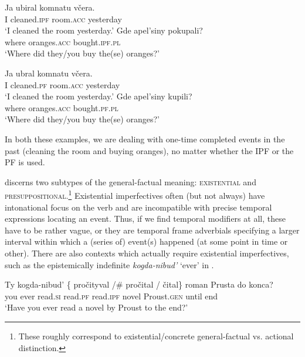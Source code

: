 \documentclass[output=paper,
modfonts,
newtxmath,
hidelinks
]{langscibook}
\begin{document}
\ea\label{oranges}
\ea\gll Ja ubiral komnatu včera.\\
       I cleaned.\textsc{ipf} room.\textsc{acc} yesterday\\
\glt       `I cleaned the room yesterday.'
\ex\gll Gde apel'siny pokupali?\\
               where oranges.\textsc{acc} bought.\textsc{ipf}.\textsc{pl} \\
\glt               `Where did they/you buy the(se) oranges?'
\z\z

\ea\label{orangesPF}
\ea\gll Ja ubral komnatu včera.\\
       I cleaned.\textsc{pf} room.\textsc{acc} yesterday\\
\glt       `I cleaned the room yesterday.'
\ex\gll Gde apel'siny kupili?\\
     where oranges.\textsc{acc} bought.\textsc{pf}.\textsc{pl}\\
\glt               `Where did they/you buy the(se) oranges?'
\z\z

\noindent In both these examples, we are dealing with one-time completed events in the past (cleaning the room and buying oranges), no matter whether the IPF or the PF is used.

\citet{gronndiss} discerns two subtypes of the general-factual meaning: \textsc{existential} and \textsc{presuppositional}.\footnote{These roughly correspond to  existential/concrete general-factual vs. actional distinction.} Existential imperfectives often (but not always) have intonational focus on the verb and are incompatible with precise temporal expressions locating an event. Thus, if we find temporal modifiers at all, these have to be rather vague, or they are temporal frame adverbials specifying a larger interval within which a (series of) event(s) happened (at some point in time or other). There are also contexts which actually require existential imperfectives, such as the epistemically indefinite \textit{kogda-nibud'} `ever' in .

\ea\gll Ty kogda-nibud' \{\hspace{-2pt} pročityval /\#\hspace{-2pt} pročital / čital\} roman Prusta do konca? \\
you ever {} read.\textsc{si} {} read.\textsc{pf} {} read.\textsc{ipf} novel Proust.\textsc{gen} until end\\
\glt `Have you ever read a novel by Proust to the end?' \hfill \citep[][73]{gronndiss}\label{Proust}
\z
\end{document}
